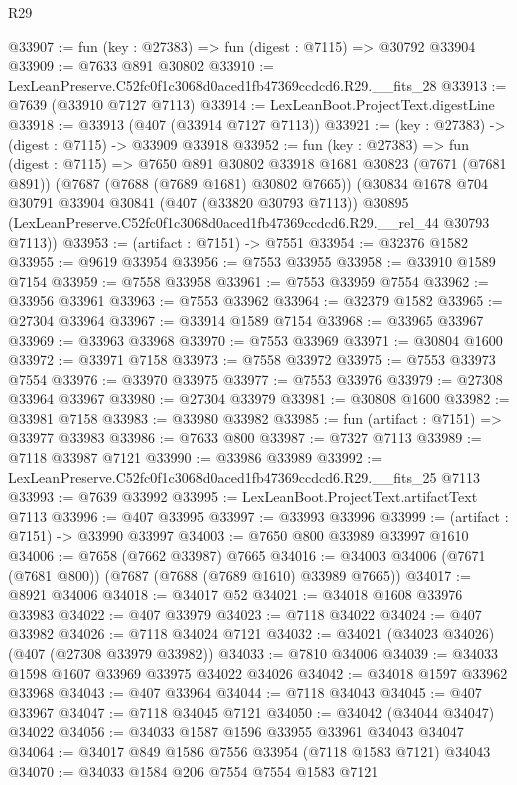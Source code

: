 \begin{lexlean}{R29}
\begin{coremodule}
@33907 := fun (key : @27383) => fun (digest : @7115) => @30792 @33904
@33909 := @7633 @891 @30802
@33910 := LexLeanPreserve.C52fc0f1c3068d0aced1fb47369ccdcd6.R29.__fits_28
@33913 := @7639 (@33910 @7127 @7113)
@33914 := LexLeanBoot.ProjectText.digestLine
@33918 := @33913 (@407 (@33914 @7127 @7113))
@33921 := (key : @27383) -> (digest : @7115) -> @33909 @33918
@33952 := fun (key : @27383) =>
  fun (digest : @7115) =>
  @7650
    @891
    @30802
    @33918
    @1681
    @30823
    (@7671 (@7681 @891))
    (@7687 (@7688 (@7689 @1681) @30802 @7665))
    (@30834
      @1678
      @704
      @30791
      @33904
      @30841
      (@407 (@33820 @30793 @7113))
      @30895
      (LexLeanPreserve.C52fc0f1c3068d0aced1fb47369ccdcd6.R29.__rel_44 @30793 @7113))
@33953 := (artifact : @7151) -> @7551
@33954 := @32376 @1582
@33955 := @9619 @33954
@33956 := @7553 @33955
@33958 := @33910 @1589 @7154
@33959 := @7558 @33958
@33961 := @7553 @33959 @7554
@33962 := @33956 @33961
@33963 := @7553 @33962
@33964 := @32379 @1582
@33965 := @27304 @33964
@33967 := @33914 @1589 @7154
@33968 := @33965 @33967
@33969 := @33963 @33968
@33970 := @7553 @33969
@33971 := @30804 @1600
@33972 := @33971 @7158
@33973 := @7558 @33972
@33975 := @7553 @33973 @7554
@33976 := @33970 @33975
@33977 := @7553 @33976
@33979 := @27308 @33964 @33967
@33980 := @27304 @33979
@33981 := @30808 @1600
@33982 := @33981 @7158
@33983 := @33980 @33982
@33985 := fun (artifact : @7151) => @33977 @33983
@33986 := @7633 @800
@33987 := @7327 @7113
@33989 := @7118 @33987 @7121
@33990 := @33986 @33989
@33992 := LexLeanPreserve.C52fc0f1c3068d0aced1fb47369ccdcd6.R29.__fits_25 @7113
@33993 := @7639 @33992
@33995 := LexLeanBoot.ProjectText.artifactText @7113
@33996 := @407 @33995
@33997 := @33993 @33996
@33999 := (artifact : @7151) -> @33990 @33997
@34003 := @7650 @800 @33989 @33997 @1610
@34006 := @7658 (@7662 @33987) @7665
@34016 := @34003 @34006 (@7671 (@7681 @800)) (@7687 (@7688 (@7689 @1610) @33989 @7665))
@34017 := @8921 @34006
@34018 := @34017 @52
@34021 := @34018 @1608 @33976 @33983
@34022 := @407 @33979
@34023 := @7118 @34022
@34024 := @407 @33982
@34026 := @7118 @34024 @7121
@34032 := @34021 (@34023 @34026) (@407 (@27308 @33979 @33982))
@34033 := @7810 @34006
@34039 := @34033 @1598 @1607 @33969 @33975 @34022 @34026
@34042 := @34018 @1597 @33962 @33968
@34043 := @407 @33964
@34044 := @7118 @34043
@34045 := @407 @33967
@34047 := @7118 @34045 @7121
@34050 := @34042 (@34044 @34047) @34022
@34056 := @34033 @1587 @1596 @33955 @33961 @34043 @34047
@34064 := @34017 @849 @1586 @7556 @33954 (@7118 @1583 @7121) @34043
@34070 := @34033 @1584 @206 @7554 @7554 @1583 @7121

\end{coremodule}
\end{lexlean}

